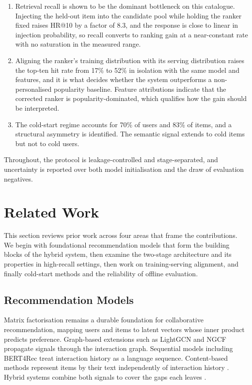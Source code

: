 \documentclass[10pt,twocolumn]{article}
\begin{document}
\begin{enumerate}\itemsep2pt
\item Retrieval recall is shown to be the dominant bottleneck on this
catalogue. Injecting the held-out item into the candidate pool while holding
the ranker fixed raises HR@10 by a factor of 8.3, and the response is close to
linear in injection probability, so recall converts to ranking gain at a
near-constant rate with no saturation in the measured range.

\item Aligning the ranker's training distribution with its serving
distribution raises the top-ten hit rate from 17\% to 52\% in isolation with
the same model and features, and it is what decides whether the system
outperforms a non-personalised popularity baseline. Feature attributions
indicate that the corrected ranker is popularity-dominated, which qualifies
how the gain should be interpreted.

\item The cold-start regime accounts for 70\% of users and 83\% of items, and
a structural asymmetry is identified. The semantic signal extends to cold
items but not to cold users.
\end{enumerate}

Throughout, the protocol is leakage-controlled and stage-separated, and
uncertainty is reported over both model initialisation and the draw of
evaluation negatives.

\section{Related Work}
\label{sec:related}

This section reviews prior work across four areas that frame the
contributions. We begin with foundational recommendation models that form the
building blocks of the hybrid system, then examine the two-stage architecture
and its properties in high-recall settings, then work on training-serving
alignment, and finally cold-start methods and the reliability of offline
evaluation.

\subsection{Recommendation Models}
Matrix factorisation \citep{alhejaili2022expressive,koren2009matrix} remains a
durable foundation for collaborative recommendation, mapping users and items to
latent vectors whose inner product predicts preference. Graph-based extensions
such as LightGCN \citep{he2020lightgcn} and NGCF \citep{wang2019neural}
propagate signals through the interaction graph. Sequential models including
BERT4Rec \citep{sun2019bert4rec} treat interaction history as a language
sequence. Content-based methods represent items by their text independently of
interaction history \citep{li2023text}. Hybrid systems combine both signals to
cover the gaps each leaves \citep{ahmadian2025comprehensive,burke2002hybrid}.
\end{document}

